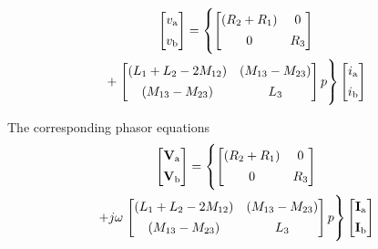 \documentclass[a4paper,numbers=noenddot,12pt]{scrbook}
\begin{document}
\begin{multline*}
    \begin{bmatrix}
        v_{\textup{a}} \\[1ex] v_{\textup{b}}
    \end{bmatrix}
    = \left\{ 
        \begin{bmatrix}
            (R_2 + R_1) & 0 \\[1ex] 0 & R_3
        \end{bmatrix} 
        \right.
        \\
        +
        \left.
        \begin{bmatrix}
            (L_1 + L_2 - 2 M_{12}) & (M_{13} - M_{23}) \\[1ex]
            (M_{13} - M_{23}) & L_3
        \end{bmatrix}
        p
    \right\}
    \begin{bmatrix}
        i_{\textup{a}} \\[1ex] i_{\textup{b}}
    \end{bmatrix}
\end{multline*}

The corresponding phasor equations
\begin{multline*}
    \begin{bmatrix}
        \mathbf{V}_{\textup{a}} \\[1ex] \mathbf{V}_{\textup{b}}
    \end{bmatrix}
    = \left\{ 
        \begin{bmatrix}
            (R_2 + R_1) & 0 \\[1ex] 0 & R_3
        \end{bmatrix} 
        \right.
        \\
        + j \omega
        \left.
        \begin{bmatrix}
            (L_1 + L_2 - 2 M_{12}) & (M_{13} - M_{23}) \\[1ex]
            (M_{13} - M_{23}) & L_3
        \end{bmatrix}
        p
    \right\}
    \begin{bmatrix}
        \mathbf{I}_{\textup{a}} \\[1ex] \mathbf{I}_{\textup{b}}
    \end{bmatrix}
\end{multline*}
\end{document}
